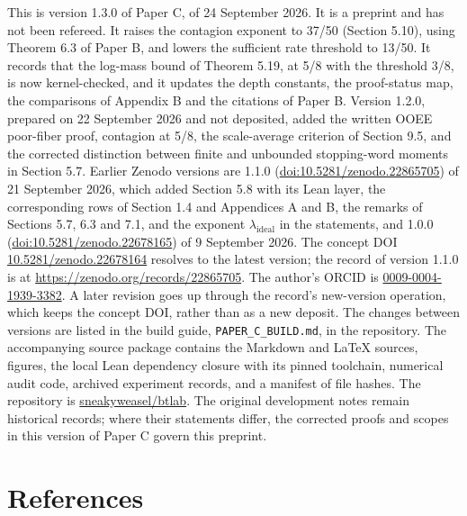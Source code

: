 \documentclass[11pt,a4paper]{article}
\begin{document}
This is version 1.3.0 of Paper C, of 24 September 2026. It is a preprint
and has not been refereed. It raises the contagion exponent to 37/50
(Section 5.10), using Theorem 6.3 of Paper B, and lowers the sufficient
rate threshold to 13/50. It records that the log-mass bound of Theorem
5.19, at 5/8 with the threshold 3/8, is now kernel-checked, and it
updates the depth constants, the proof-status map, the comparisons of
Appendix B and the citations of Paper B. Version 1.2.0, prepared on 22
September 2026 and not deposited, added the written OOEE poor-fiber
proof, contagion at 5/8, the scale-average criterion of Section 9.5, and
the corrected distinction between finite and unbounded stopping-word
moments in Section 5.7. Earlier Zenodo versions are 1.1.0
(\href{https://doi.org/10.5281/zenodo.22865705}{doi:10.5281/zenodo.22865705})
of 21 September 2026, which added Section 5.8 with its Lean layer, the
corresponding rows of Section 1.4 and Appendices A and B, the remarks of
Sections 5.7, 6.3 and 7.1, and the exponent \(\lambda_{\mathrm{ideal}}\)
in the statements, and 1.0.0
(\href{https://doi.org/10.5281/zenodo.22678165}{doi:10.5281/zenodo.22678165})
of 9 September 2026. The concept DOI
\href{https://doi.org/10.5281/zenodo.22678164}{10.5281/zenodo.22678164}
resolves to the latest version; the record of version 1.1.0 is at
\url{https://zenodo.org/records/22865705}. The author's ORCID is
\href{https://orcid.org/0009-0004-1939-3382}{0009-0004-1939-3382}. A
later revision goes up through the record's new-version operation, which
keeps the concept DOI, rather than as a new deposit. The changes between
versions are listed in the build guide,
\texttt{\nolinkurl{PAPER_C_BUILD.md}}, in the repository. The
accompanying source package contains the Markdown and LaTeX sources,
figures, the local Lean dependency closure with its pinned toolchain,
numerical audit code, archived experiment records, and a manifest of
file hashes. The repository is
\href{https://github.com/sneakyweasel/btlab}{sneakyweasel/btlab}. The
original development notes remain historical records; where their
statements differ, the corrected proofs and scopes in this version of
Paper C govern this preprint.

\section{References}\label{references}

\begingroup\small
\end{document}
